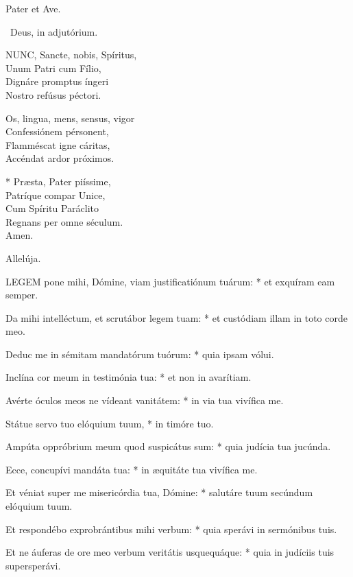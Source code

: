 \sectionornament


Pater et Ave.

\V\ Deus, in adjutórium.


\lettrine[lines=2]{N}{UNC}, Sancte, nobis, Spíritus,\\
Unum Patri cum Fílio,\\
Dignáre promptus íngeri\\
Nostro refúsus péctori.

Os, lingua, mens, sensus, vigor\\
Confessiónem pérsonent,\\
Flamméscat igne cáritas,\\
Accéndat ardor próximos.

* Præsta, Pater piíssime,\\
Patríque compar Unice,\\
Cum Spíritu Paráclito\\
Regnans per omne séculum.\\
Amen.

  Allelúja.


\lettrine[lines=2]{L}{EGEM} pone mihi, Dómine, viam justificatiónum tuárum: * et exquíram eam semper.

Da mihi intelléctum, et scrutábor legem tuam: * et custódiam illam in toto corde meo.

Deduc me in sémitam mandatórum tuórum: * quia ipsam vólui.

Inclína cor meum in testimónia tua: * et non in avarítiam.

Avérte óculos meos ne vídeant vanitátem: * in via tua vivífica me.

Státue servo tuo elóquium tuum, * in timóre tuo.

Ampúta oppróbrium meum quod suspicátus sum: * quia judícia tua jucúnda.

Ecce, concupívi mandáta tua: * in æquitáte tua vivífica me.

Et véniat super me misericórdia tua, Dómine: * salutáre tuum secúndum elóquium tuum.

Et respondébo exprobrántibus mihi verbum: * quia sperávi in sermónibus tuis.

Et ne áuferas de ore meo verbum veritátis usquequáque: * quia in judíciis tuis supersperávi.


